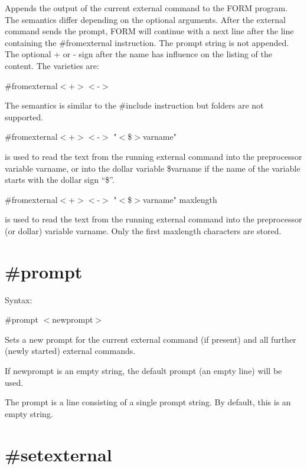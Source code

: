 \noindent Appends the output of the current 
external 
command to the FORM program. The semantics differ depending on the optional 
arguments. After the external command sends the prompt, FORM will continue 
with a next line after the line containing the \#fromexternal instruction. 
The prompt string is not appended. The optional + or - sign after the name 
has influence on the listing of the content. The varieties are:
                                                           
\#fromexternal$<$+$>$$<$-$>$

\noindent The semantics is similar to the \#include 
instruction but folders are not supported. 

\#fromexternal$<$+$>$$<$-$>$ "$<$\$$>$varname"

\noindent is used to read the text from the running external command into 
the preprocessor variable varname, or into the dollar variable \$varname if 
the name of the variable starts with the dollar sign ``\$''.

\#fromexternal$<$+$>$$<$-$>$ "$<$\$$>$varname" maxlength

\noindent is used to read the text from the running external command into 
the preprocessor (or dollar) variable varname. Only the first maxlength 
characters are stored.


\section{\#prompt}
\label{promptcommunication}

\noindent Syntax:

\#prompt $<$newprompt$>$

\noindent Sets a new prompt for the current external 
command (if present) and all further (newly started) external commands.

If newprompt is an empty string, the default prompt (an empty line) will be 
used.

The prompt is a line consisting of a single prompt string. By default, this 
is an empty string.


\section{\#setexternal}
\label{setexternalcommunication}

